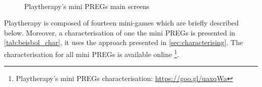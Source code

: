 \begin{figure}[bth]
\centering
{}
\\
\caption{Playtherapy's mini \acp{PREG} main screens}
\label{fig:platherapy_screens}
\end{figure}

Playtherapy is composed of fourteen mini-games which are briefly described below. Moreover, a characterisation of one the mini \acp{PREG} is presented in \autoref{tab:beisbol_char}, it uses the approach presented in \autoref{sec:characterising}. The characterisation for all mini \acp{PREG} is available online \footnote{Playtherapy's mini \acp{PREG} characterisation: \url{https://goo.gl/uaxqWa}}.

